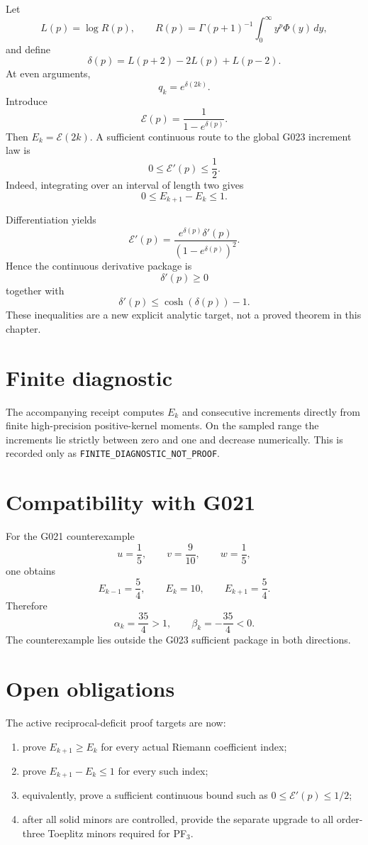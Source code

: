 Let
\[
 L(p)=\log R(p),
 \qquad
 R(p)=\Gamma(p+1)^{-1}\int_0^\infty y^p\Phi(y)\,dy,
\]
and define
\[
 \delta(p)=L(p+2)-2L(p)+L(p-2).
\]
At even arguments,
\[
 q_k=e^{\delta(2k)}.
\]
Introduce
\[
 \boxed{
 \mathcal E(p)=\frac{1}{1-e^{\delta(p)}}.
 }
\]
Then $E_k=\mathcal E(2k)$. A sufficient continuous route to the global G023
increment law is
\[
 \boxed{
 0\le\mathcal E'(p)\le\frac12.
 }
\]
Indeed, integrating over an interval of length two gives
\[
 0\le E_{k+1}-E_k\le1.
\]

Differentiation yields
\[
 \mathcal E'(p)
 =\frac{e^{\delta(p)}\delta'(p)}{(1-e^{\delta(p)})^2}.
\]
Hence the continuous derivative package is
\[
 \boxed{\delta'(p)\ge0}
\]
together with
\[
 \boxed{
 \delta'(p)\le\cosh(\delta(p))-1.
 }
\]
These inequalities are a new explicit analytic target, not a proved theorem in
this chapter.

\section{Finite diagnostic}

The accompanying receipt computes $E_k$ and consecutive increments directly
from finite high-precision positive-kernel moments. On the sampled range the
increments lie strictly between zero and one and decrease numerically. This is
recorded only as \texttt{FINITE\_DIAGNOSTIC\_NOT\_PROOF}.

\section{Compatibility with G021}

For the G021 counterexample
\[
 u=\frac15,
 \qquad
 v=\frac9{10},
 \qquad
 w=\frac15,
\]
one obtains
\[
 E_{k-1}=\frac54,
 \qquad
 E_k=10,
 \qquad
 E_{k+1}=\frac54.
\]
Therefore
\[
 \alpha_k=\frac{35}{4}>1,
 \qquad
 \beta_k=-\frac{35}{4}<0.
\]
The counterexample lies outside the G023 sufficient package in both directions.

\section{Open obligations}

The active reciprocal-deficit proof targets are now:
\begin{enumerate}
 \item prove $E_{k+1}\ge E_k$ for every actual Riemann coefficient index;
 \item prove $E_{k+1}-E_k\le1$ for every such index;
 \item equivalently, prove a sufficient continuous bound such as
       $0\le\mathcal E'(p)\le1/2$;
 \item after all solid minors are controlled, provide the separate upgrade to
       all order-three Toeplitz minors required for PF$_3$.
\end{enumerate}

